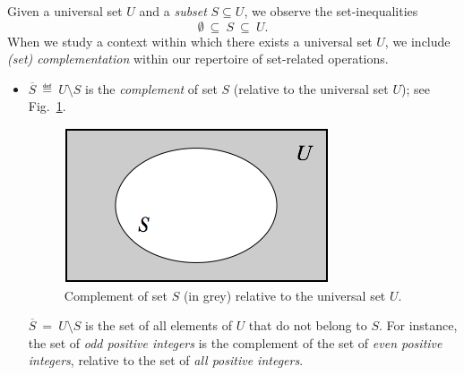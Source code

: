 \bigskip

\noindent {}
\bigskip

\noindent
Given a universal set $U$ and a {\em subset} $S \subseteq U$, we observe the set-inequalities
\[ \emptyset \ \subseteq \ S \ \subseteq \ U. \]
When we study a context within which there exists a universal set $U$, we include {\it (set) complementation} within our repertoire of set-related operations.
\begin{itemize}
\item
$\overline{S} \ \eqdef \ U \setminus S$ is the {\em complement} of set $S$ (relative to the universal set $U$); see Fig.~\ref{fig:setComplement}.
\begin{figure}[htb]
\begin{center}
        \includegraphics[scale=0.4]{FiguresMaths/setComplement}
        \caption{Complement of set $S$ (in grey) relative to the universal set $U$.}
        \label{fig:setComplement}
\end{center}
\end{figure}

\smallskip

$\overline{S} \ = \ U \setminus S$ is the set of all elements of $U$ that do not belong to $S$.  For instance, the set of {\em odd positive integers} is the complement of the set of {\em even positive integers}, relative to the set of {\em all positive integers}.
\end{itemize}

